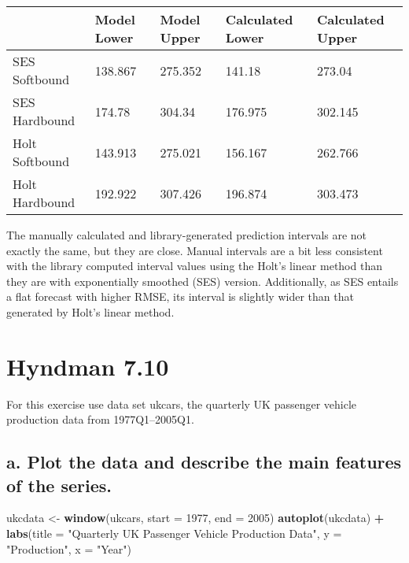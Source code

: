 \documentclass[openany]{book}
\newenvironment{Shaded}{\begin{snugshade}}{\end{snugshade}}
\newcommand{\DataTypeTok}[1]{\textcolor[rgb]{0.13,0.29,0.53}{#1}}
\newcommand{\DecValTok}[1]{\textcolor[rgb]{0.00,0.00,0.81}{#1}}
\newcommand{\KeywordTok}[1]{\textcolor[rgb]{0.13,0.29,0.53}{\textbf{#1}}}
\newcommand{\NormalTok}[1]{#1}
\newcommand{\OperatorTok}[1]{\textcolor[rgb]{0.81,0.36,0.00}{\textbf{#1}}}
\newcommand{\StringTok}[1]{\textcolor[rgb]{0.31,0.60,0.02}{#1}}
\renewenvironment{quote}{\begin{myquote}}{\end{myquote}}
\begin{document}
\begin{longtable}[]{@{}lllll@{}}
\toprule
& Model Lower & Model Upper & Calculated Lower & Calculated Upper\tabularnewline
\midrule
\endhead
SES Softbound & 138.867 & 275.352 & 141.18 & 273.04\tabularnewline
SES Hardbound & 174.78 & 304.34 & 176.975 & 302.145\tabularnewline
Holt Softbound & 143.913 & 275.021 & 156.167 & 262.766\tabularnewline
Holt Hardbound & 192.922 & 307.426 & 196.874 & 303.473\tabularnewline
\bottomrule
\end{longtable}

The manually calculated and library-generated prediction intervals are not exactly the same, but they are close. Manual intervals are a bit less consistent with the library computed interval values using the Holt's linear method than they are with exponentially smoothed (SES) version. Additionally, as SES entails a flat forecast with higher RMSE, its interval is slightly wider than that generated by Holt's linear method.

\hypertarget{hyndman-7.10}{%
\section{Hyndman 7.10}\label{hyndman-7.10}}

\begin{quote}
For this exercise use data set ukcars, the quarterly UK passenger vehicle production data from 1977Q1--2005Q1.
\end{quote}

\hypertarget{a.-plot-the-data-and-describe-the-main-features-of-the-series.}{%
\subsection{a. Plot the data and describe the main features of the series.}\label{a.-plot-the-data-and-describe-the-main-features-of-the-series.}}

\begin{Shaded}
\begin{Highlighting}[]
\NormalTok{ukcdata <-}\StringTok{ }\KeywordTok{window}\NormalTok{(ukcars, }\DataTypeTok{start =} \DecValTok{1977}\NormalTok{, }\DataTypeTok{end =} \DecValTok{2005}\NormalTok{)}
\KeywordTok{autoplot}\NormalTok{(ukcdata) }\OperatorTok{+}\StringTok{ }\KeywordTok{labs}\NormalTok{(}\DataTypeTok{title =} \StringTok{"Quarterly UK Passenger Vehicle Production Data"}\NormalTok{, }
  \DataTypeTok{y =} \StringTok{"Production"}\NormalTok{, }\DataTypeTok{x =} \StringTok{"Year"}\NormalTok{)}
\end{Highlighting}
\end{Shaded}
\end{document}
